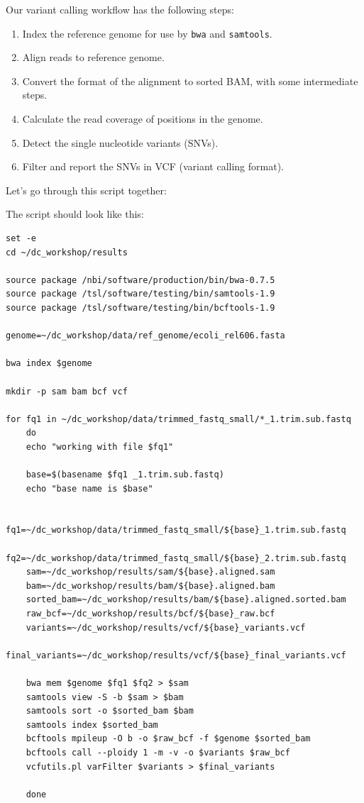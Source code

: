 \documentclass[
  letterpaper,
  DIV=11,
  numbers=noendperiod]{scrreprt}
\newenvironment{Shaded}{\begin{snugshade}}{\end{snugshade}}
\newcommand{\ExtensionTok}[1]{\textcolor[rgb]{0.00,0.23,0.31}{#1}}
\newcommand{\NormalTok}[1]{\textcolor[rgb]{0.00,0.23,0.31}{#1}}
\providecommand{\tightlist}{%
  \setlength{\itemsep}{0pt}\setlength{\parskip}{0pt}}\usepackage{longtable,booktabs,array}
\begin{document}
Our variant calling workflow has the following steps:

\begin{enumerate}
\def\labelenumi{\arabic{enumi}.}
\tightlist
\item
  Index the reference genome for use by \texttt{bwa} and
  \texttt{samtools}.
\item
  Align reads to reference genome.
\item
  Convert the format of the alignment to sorted BAM, with some
  intermediate steps.
\item
  Calculate the read coverage of positions in the genome.
\item
  Detect the single nucleotide variants (SNVs).
\item
  Filter and report the SNVs in VCF (variant calling format).
\end{enumerate}

Let's go through this script together:

\begin{Shaded}
\end{Shaded}

The script should look like this:

\begin{verbatim}
set -e
cd ~/dc_workshop/results

source package /nbi/software/production/bin/bwa-0.7.5
source package /tsl/software/testing/bin/samtools-1.9
source package /tsl/software/testing/bin/bcftools-1.9

genome=~/dc_workshop/data/ref_genome/ecoli_rel606.fasta

bwa index $genome

mkdir -p sam bam bcf vcf

for fq1 in ~/dc_workshop/data/trimmed_fastq_small/*_1.trim.sub.fastq
    do
    echo "working with file $fq1"

    base=$(basename $fq1 _1.trim.sub.fastq)
    echo "base name is $base"

    fq1=~/dc_workshop/data/trimmed_fastq_small/${base}_1.trim.sub.fastq
    fq2=~/dc_workshop/data/trimmed_fastq_small/${base}_2.trim.sub.fastq
    sam=~/dc_workshop/results/sam/${base}.aligned.sam
    bam=~/dc_workshop/results/bam/${base}.aligned.bam
    sorted_bam=~/dc_workshop/results/bam/${base}.aligned.sorted.bam
    raw_bcf=~/dc_workshop/results/bcf/${base}_raw.bcf
    variants=~/dc_workshop/results/vcf/${base}_variants.vcf
    final_variants=~/dc_workshop/results/vcf/${base}_final_variants.vcf 

    bwa mem $genome $fq1 $fq2 > $sam
    samtools view -S -b $sam > $bam
    samtools sort -o $sorted_bam $bam
    samtools index $sorted_bam
    bcftools mpileup -O b -o $raw_bcf -f $genome $sorted_bam
    bcftools call --ploidy 1 -m -v -o $variants $raw_bcf 
    vcfutils.pl varFilter $variants > $final_variants
   
    done
\end{verbatim}
\end{document}
